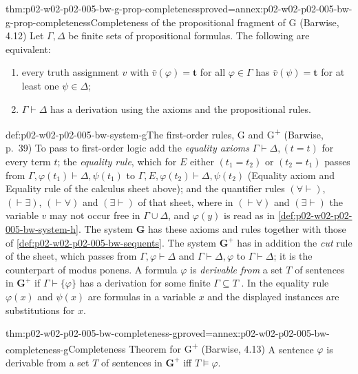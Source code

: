 \begin{hbtheorem}{thm:p02-w02-p02-005-bw-g-prop-completeness}{proved=annex:p02-w02-p02-005-bw-g-prop-completeness}{Completeness of the propositional fragment of G (Barwise, 4.12)}
Let \(\Gamma,\Delta\) be finite sets of propositional formulas.  The
following are equivalent:
\begin{enumerate}
\item[(i)] every truth assignment \(v\) with \(\bar v(\varphi)=\mathbf t\)
      for all \(\varphi\in\Gamma\) has \(\bar v(\psi)=\mathbf t\) for at
      least one \(\psi\in\Delta\);
\item[(ii)] \(\Gamma\vdash\Delta\) has a derivation using the axioms and
      the propositional rules.
\end{enumerate}
\end{hbtheorem}

\begin{hbdefinition}{def:p02-w02-p02-005-bw-system-g}{The first-order rules, G and G\textsuperscript{+} (Barwise, p.~39)}
To pass to first-order logic add the \emph{equality axioms}
\(\Gamma\vdash\Delta,(t=t)\) for every term \(t\); the \emph{equality
rule}, which for \(E\) either \((t_1=t_2)\) or \((t_2=t_1)\) passes
from \(\Gamma,\varphi(t_1)\vdash\Delta,\psi(t_1)\) to
\(\Gamma,E,\varphi(t_2)\vdash\Delta,\psi(t_2)\) (Equality axiom and
Equality rule of the calculus sheet above); and the quantifier rules
\((\forall\vdash)\), \((\vdash\exists)\), \((\vdash\forall)\) and
\((\exists\vdash)\) of that sheet, where in \((\vdash\forall)\) and \((\exists\vdash)\) the variable \(v\) may
not occur free in \(\Gamma\cup\Delta\), and \(\varphi(y)\) is read as in
\cref{def:p02-w02-p02-005-bw-system-h}.  The system \(\mathbf G\) has these
axioms and rules together with those of
\cref{def:p02-w02-p02-005-bw-sequents}.  The system
\(\mathbf G^{+}\) has in addition the \emph{cut} rule of the sheet, which
passes from \(\Gamma,\varphi\vdash\Delta\) and \(\Gamma\vdash\Delta,\varphi\)
to \(\Gamma\vdash\Delta\); it is the counterpart of modus ponens.
A formula \(\varphi\) is \emph{derivable from} a set \(T\) of sentences in
\(\mathbf G^{+}\) if \(\Gamma\vdash\{\varphi\}\) has a derivation for some
finite \(\Gamma\subseteq T\) \cite[ch.~A.1, \S4, p.~39]{Barwise1977FirstOrder}.
In the equality rule \(\varphi(x)\) and \(\psi(x)\) are formulas in a
variable \(x\) and the displayed instances are substitutions for \(x\).
\end{hbdefinition}

\begin{hbtheorem}{thm:p02-w02-p02-005-bw-completeness-g}{proved=annex:p02-w02-p02-005-bw-completeness-g}{Completeness Theorem for G\textsuperscript{+} (Barwise, 4.13)}
A sentence \(\varphi\) is derivable from a set \(T\) of sentences in
\(\mathbf G^{+}\) iff \(T\models\varphi\).
\end{hbtheorem}

